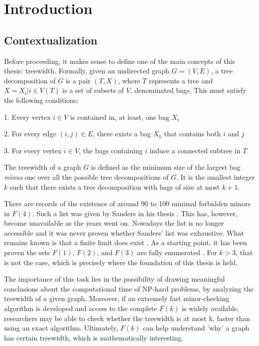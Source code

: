 \section{Introduction}

\subsection{Contextualization} 
Before proceeding, it makes sense to define one of the main concepts of this thesis: treewidth. Formally, given an undirected graph $G=(V,E)$, a tree decomposition of $G$ is a pair $(T,X)$, where $T$ represents a tree and $X={X_i|i\in V(T)}$ is a set of subsets of $V$, denominated bags. This must satisfy the following conditions:

1. Every vertex $i \in V$ is contained in, at least, one bag $X_i$\par
2. For every edge $(i,j) \in E$, there exists a bag $X_k$ that contains both $i$ and $j$\par
3. For every vertex $i \in V$, the bags containing $i$ induce a connected subtree in $T$

The treewidth of a graph $G$ is defined as the minimum size of the largest bag \textit{minus} one over all the possible tree decompositions of $G$. It is the smallest integer $k$ such that there exists a tree decomposition with bags of size at most $k+1$.

There are records of the existence of around 90 to 100 minimal forbidden minors in $F(4)$. Such a list was given by Sanders in his thesis \cite{sanders1996}. This has, however, become unavailable as the years went on. Nowadays the list is no longer accessible and it was never proven whether Sanders' list was exhaustive. What remains known is that a finite limit does exist \cite{robertson2004wagners}. As a starting point, it has been proven the sets $F(1)$, $F(2)$, and $F(3)$ are fully enumerated \cite{bodlaender1988} \cite{aarnborg1990}. For $k>3$, that is not the case, which is precisely where the foundation of this thesis is held.

The importance of this task lies in the possibility of drawing meaningful conclusions about the computational time of NP-hard problems, by analyzing the treewidth of a given graph. Moreover, if an extremely fast minor-checking algorithm is developed and access to the complete $F(k)$ is widely available, researchers may be able to check whether the treewidth is at most k, faster than using an exact algorithm. Ultimately, $F(k)$ can help understand 'why' a graph has certain treewidth, which is mathematically interesting.


